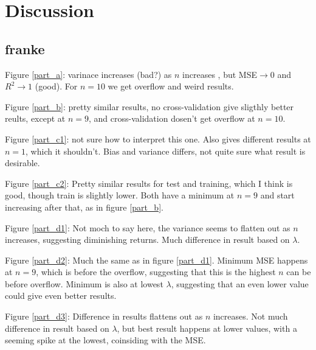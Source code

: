\documentclass[a4paper,10pt,english]{article}
\begin{document}






\section{Discussion}
\label{sec:discussion}

\subsection{franke}

Figure \ref{part_a}: varinace increases (bad?) as $n$ increases , but MSE$\rightarrow 0$ and $R^2\rightarrow 1$ (good). For $n=10$ we get overflow and weird results.

Figure \ref{part_b}: pretty similar results, no cross-validation give sligthly better reults, except at $n=9$, and cross-validation dosen't get overflow at $n=10$.

Figure \ref{part_c1}: not sure how to interpret this one. Also gives different results at $n=1$, which it shouldn't. Bias and variance differs, not quite sure what result is desirable.

Figure \ref{part_c2}: Pretty similar results for test and training, which I think is good, though train is slightly lower. Both have a minimum at $n=9$ and start increasing after that, as in figure \ref{part_b}. 

Figure \ref{part_d1}: Not moch to say here, the variance seems to flatten out as $n$ increases, suggesting diminishing returns. Much difference in result based on $\lambda$.

Figure \ref{part_d2}: Much the same as in figure \ref{part_d1}. Minimum MSE happens at $n=9$, which is before the overflow, suggesting that this is the highest $n$ can be before overflow. Minimum is also at lowest $\lambda$, suggesting that an even lower value could give even better results.

Figure \ref{part_d3}: Difference in results flattens out as $n$ increases. Not much difference in result based on $\lambda$, but best result happens at lower values, with a seeming spike at the lowest, coinsiding with the MSE. 
\end{document}
